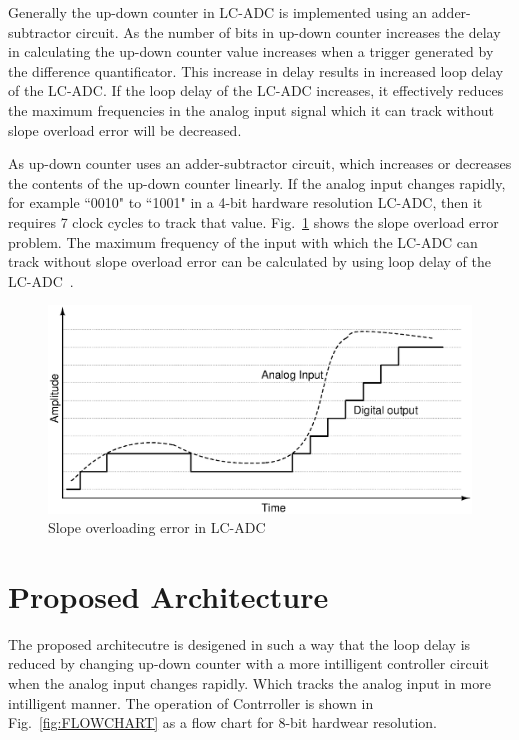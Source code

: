 \documentclass[conference]{IEEEtran}
\begin{document}
	Generally the up-down counter in LC-ADC is implemented using an adder-subtractor circuit. As the number of bits in up-down counter increases the delay in calculating the up-down counter value increases when a trigger generated by the difference quantificator. This increase in delay results in increased loop delay of the LC-ADC. If the loop delay of the LC-ADC increases, it effectively reduces the maximum frequencies in the analog input signal which it can track without slope overload error will be decreased. \par

	 As up-down counter uses an adder-subtractor circuit, which increases or decreases the contents of the up-down counter linearly. If the analog input changes rapidly, for example ``0010" to ``1001" in a 4-bit hardware resolution LC-ADC, then it requires 7 clock cycles to track that value. Fig.~\ref{fig:SOE} shows the slope overload error problem. The maximum frequency of the input with which the LC-ADC can track without slope overload error can be calculated by using loop delay of the LC-ADC~\cite{allier2005120nm}. \par

\begin{figure}[ht]
	\begin{center}
		\includegraphics[width=8.5 cm, angle=360]{./Figures/SOE.ps}
		\caption{Slope overloading error in LC-ADC}
		\label{fig:SOE}
	\end{center}
\end{figure}


\section{Proposed Architecture}

	The proposed architecutre is desigened in such a way that the loop delay is reduced by changing up-down counter with a more intilligent controller circuit when the analog input changes rapidly. Which tracks the analog input in more intilligent manner. The operation of Contrroller is shown in Fig.~\ref{fig:FLOWCHART} as a flow chart for 8-bit hardwear resolution. \par
\end{document}
